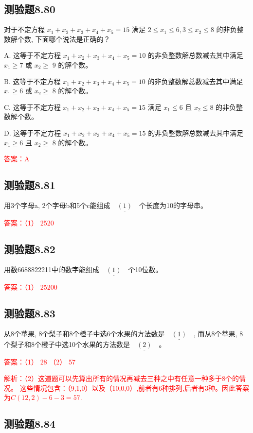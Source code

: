 \documentclass[UTF8, heading=true]{ctexart}
\begin{document}
\subsection{测验题8.80}

对于不定方程 $x_1+x_2+x_3+x_4+x_5=15$ 满足 $2 \leq x_1 \leq 6,3 \leq x_2 \leq 8$ 的非负整数解个数, 下面哪个说法是正确的？

A. 
这等于不定方程 $x_1+x_2+x_3+x_4+x_5=10$ 的非负整数解总数减去其中满足 $x_1 \geq 7$ 或 $x_2 \geq$ 9 的解个数。

B. 
这等于不定方程 $x_1+x_2+x_3+x_4+x_5=10$ 的非负整数解总数减去其中满足 $x_1 \geq 6$ 或 $x_2 \geq$ 8 的解个数。

C. 这等于不定方程 $x_1+x_2+x_3+x_4+x_5=15$ 满足 $x_1 \leq 6$ 且 $x_2 \leq 8$ 的非负整数解个数。

D. 这等于不定方程 $x_1+x_2+x_3+x_4+x_5=15$ 的非负整数解总数减去其中满足 $x_1 \geq 6$ 且 $x_2 \geq$ 8 的解个数。

\textcolor{red}{答案：A}

\subsection{测验题8.81}

用3个字母a, 2个字母b和5个c能组成$\underline{\quad(1)\quad}$个长度为10的字母串。

\textcolor{red}{答案：（1） 2520}

\subsection{测验题8.82}
用数6688822211中的数字能组成$\underline{\quad(1)\quad}$个10位数。

\textcolor{red}{答案：（1） 25200}

\subsection{测验题8.83}

从8个苹果, 8个梨子和8个橙子中选6个水果的方法数是$\underline{\quad(1)\quad}$, 而从8个苹果, 8个梨子和8个橙子中选10个水果的方法数是$\underline{\quad(2)\quad}$。

\textcolor{red}{答案：（1） 28 （2） 57}

\textcolor{red}{解析：（2）这道题可以先算出所有的情况再减去三种之中有任意一种多于8个的情况。
这些情况包含：（9,1,0）以及（10,0,0）,前者有6种排列,后者有3种。因此答案为$C(12,2)-6-3=57$.}
\subsection{测验题8.84}
\end{document}
